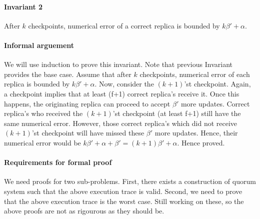 \documentclass[letterpaper,twocolumn,10pt]{article}
\begin{document}
\paragraph{Invariant 2} After $k$ checkpoints, numerical
error of a correct replica is bounded by $k\beta' +\alpha$.

\paragraph{Informal arguement} We will use induction to
prove this invariant. Note that previous Invariant provides
the base case. Assume that after $k$ checkpoints, numerical
error of each replica is bounded by $k\beta'+\alpha$. Now,
consider the $(k+1)$'st checkpoint. Again, a checkpoint
implies that at least (f+1) correct replica's receive it.
Once this happens, the originating replica can proceed
to accept $\beta'$ more updates. Correct replica's 
who received the $(k+1)$'st checkpoint (at least
f+1) still have the same numerical error. However, those
correct replica's which did not receive $(k+1)$'st checkpoint
will have missed these $\beta'$ more updates. Hence, their
numerical error would be $k\beta' +\alpha+\beta' = 
(k+1)\beta'+\alpha$. Hence proved.

\paragraph{Requirements for formal proof} We need proofs for
two sub-problems. First, there exists a construction of quorum
system such that the above execution trace is valid. Second,
we need to prove that the above execution trace is the worst
case. Still working on these, so the above proofs are not
as rigourous as they should be. 
\end{document}
